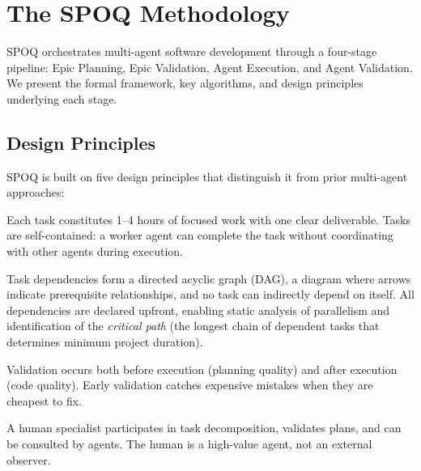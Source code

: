 \section{The SPOQ Methodology}
\label{sec:methodology}

SPOQ orchestrates multi-agent software development through a four-stage pipeline:
Epic Planning, Epic Validation, Agent Execution, and Agent Validation. We present
the formal framework, key algorithms, and design principles underlying each stage.

\subsection{Design Principles}
\label{subsec:principles}

SPOQ is built on five design principles that distinguish it from prior multi-agent approaches:

\begin{principle}
\label{prin:atomic}
Each task constitutes 1--4 hours of focused work with one clear deliverable.
Tasks are self-contained: a worker agent can complete the task without
coordinating with other agents during execution.
\end{principle}

\begin{principle}
\label{prin:dependencies}
Task dependencies form a directed acyclic graph (DAG), a diagram where arrows
indicate prerequisite relationships, and no task can indirectly depend on itself.
All dependencies are declared upfront, enabling static analysis of parallelism
and identification of the \textit{critical path} (the longest chain of dependent
tasks that determines minimum project duration).
\end{principle}

\begin{principle}
\label{prin:gates}
Validation occurs both before execution (planning quality) and after execution
(code quality). Early validation catches expensive mistakes when they are cheapest
to fix.
\end{principle}

\begin{principle}
\label{prin:human}
A human specialist participates in task decomposition, validates plans, and can
be consulted by agents. The human is a high-value agent, not an external observer.
\end{principle}

